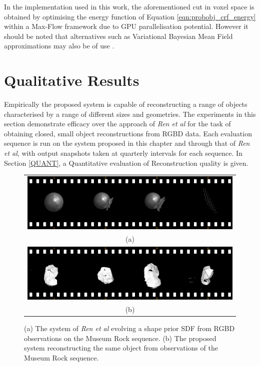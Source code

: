 In the implementation used in this work, the aforementioned cut in voxel space
is obtained by optimising the energy function of Equation \ref{eqn:probobj_crf_energy} 
within a Max-Flow framework \cite{BOYKOV} due to GPU parallelisation potential. However 
it should be noted that alternatives such as Variational Bayesian Mean Field approximations 
may also be of use \cite{KRAHENBUHL}.

\section{Qualitative Results}
Empirically the proposed system is capable of reconstructing a range of objects 
characterised by a range of different sizes and geometries. The experiments in 
this section demonstrate efficacy over the approach of \textit{Ren et al} 
\cite{Ren2013} for the task of obtaining closed, small object reconstructions 
from RGBD data. Each evaluation sequence is run on the system proposed in this 
chapter and through that of \textit{Ren et al}, with output snapshots taken at 
quarterly intervals for each sequence. In Section \ref{QUANT}, a Quantitative 
evaluation of Reconstruction quality is given.

\begin{figure}[ht]
  \label{fig:probobj_rock_s3d}
  \centering
  \begin{tabular}{@{}c@{}}
    \includegraphics[width=.6\linewidth]{figures/object_recon/strips/rock_s3d.png} \\
    (a) \\
    \includegraphics[width=.6\linewidth]{figures/object_recon/strips/rock.png} \\ 
    (b)\\
  \end{tabular}
  \caption[Probabilistic Object Reconstruction Qualitative Results I]
  {(a) The system of \textit{Ren et al} \cite{Ren2013} evolving a shape prior SDF 
  from RGBD observations on the Museum Rock sequence. (b) The proposed system reconstructing 
  the same object from observations of the Museum Rock sequence.}
\end{figure}

